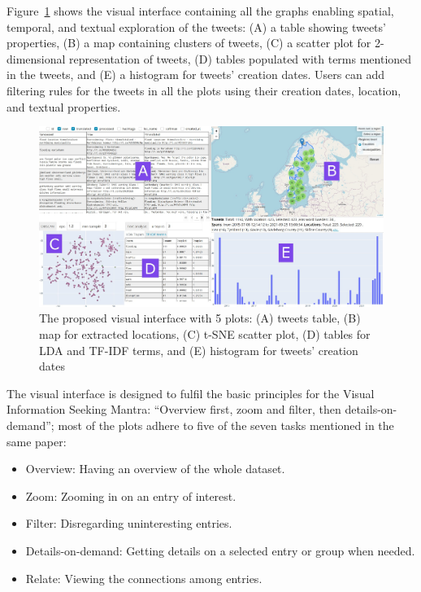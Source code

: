 Figure~\ref{fig:visual_interface} shows the visual interface containing all the graphs enabling
spatial, temporal, and textual exploration of the tweets: (A) a table showing tweets' properties,
(B) a map containing clusters of tweets, (C) a scatter plot for 2-dimensional representation of
tweets, (D) tables populated with terms mentioned in the tweets, and (E) a histogram for tweets'
creation dates. Users can add filtering rules for the tweets in all the plots using their creation
dates, location, and textual properties.

\begin{figure}[H]
\begin{center}
  \includegraphics[width=\columnwidth]{./images/visual_interface.png}
\end{center}
\caption{The proposed visual interface with 5 plots: (A) tweets table, (B) map for extracted locations, (C)
\ac{t-SNE} scatter plot, (D) tables for \ac{LDA} and \ac{TF-IDF} terms, and (E) histogram for tweets' creation dates}
\label{fig:visual_interface}
\end{figure}

The visual interface is designed to fulfil the basic principles for the Visual Information Seeking
Mantra: ``Overview first, zoom and filter, then details-on-demand''\cite{shneidermanEyesHaveIt1996}; most of the plots
adhere to five of the seven tasks mentioned in the same paper:
\begin{itemize}
  \item Overview: Having an overview of the whole dataset.
  \item Zoom: Zooming in on an entry of interest.
  \item Filter: Disregarding uninteresting entries.
  \item Details-on-demand: Getting details on a selected entry or group when needed.
  \item Relate: Viewing the connections among entries.
\end{itemize}


